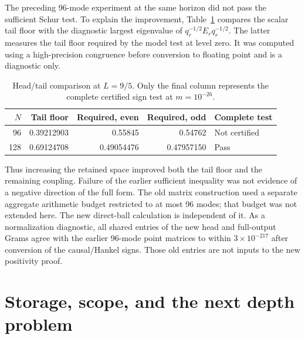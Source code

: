 \documentclass[11pt]{article}
\numberwithin{equation}{section}
\theoremstyle{definition}
\theoremstyle{remark}
\begin{document}
The preceding 96-mode experiment at the same horizon did not pass the
sufficient Schur test. To explain the improvement, Table~\ref{tab:diagnostic}
compares the scalar tail floor with the diagnostic largest eigenvalue of
$q_r^{-1/2}E_rq_r^{-1/2}$. The latter measures the tail floor required by
the model test at level zero. It was computed using a high-precision
congruence before conversion to floating point and is a diagnostic only.

\begin{table}[ht]
\centering
\caption{Head/tail comparison at $L=9/5$. Only the final column represents
the complete certified sign test at $m=10^{-26}$.}
\label{tab:diagnostic}
\begin{tabular}{@{}rrrrl@{}}
\toprule
$N$ & Tail floor & Required, even & Required, odd & Complete test\\
\midrule
96 & 0.39212903 & 0.55845 & 0.54762 & Not certified\\
128 & 0.69124708 & 0.49054476 & 0.47957150 & Pass\\
\bottomrule
\end{tabular}
\end{table}

Thus increasing the retained space improved both the tail floor and the
remaining coupling. Failure of the earlier sufficient inequality was not
evidence of a negative direction of the full form. The old matrix construction
used a separate aggregate arithmetic budget restricted to at most 96 modes;
that budget was not extended here. The new direct-ball calculation is
independent of it. As a normalization diagnostic, all shared entries of the
new head and full-output Grams agree with the earlier 96-mode point matrices
to within $3\times10^{-217}$ after conversion of the causal/Hankel signs.
Those old entries are not inputs to the new positivity proof.

\section{Storage, scope, and the next depth problem}\label{sec:storage}
\end{document}
